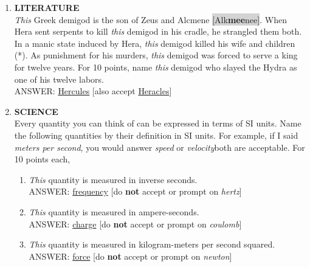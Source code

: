 \documentclass{report}
\newcommand*{\backtrack}{\setcounter{enumi}{\numexpr\theenumi-1\relax}}
\begin{document}
\begin{enumerate}
    \item \textbf{LITERATURE} \\ \textit{This} Greek demigod is the son of Zeus and Alcmene \colorbox{lightGray}{[Alk\textperiodcentered \textbf{mee}\textperiodcentered nee]}. When Hera sent serpents to kill \textit{this} demigod in his cradle, he strangled them both. In a manic state induced by Hera, \textit{this} demigod killed his wife and children (*). As punishment for his murders, \textit{this} demigod was forced to serve a king for twelve years. For 10 points, name \textit{this} demigod who slayed the Hydra as one of his twelve labors. \\ ANSWER: \underline{Hercules} [also accept \underline{Heracles}] \backtrack \newpage
    \item \textbf{SCIENCE} \\ Every quantity you can think of can be expressed in terms of SI units. Name the following quantities by their definition in SI units. For example, if I said \textit{meters per second}, you would answer \textit{speed} or \textit{velocity}\textemdash both are acceptable. For 10 points each,
    \begin{enumerate}[label=\Alph*]
        \item \textit{This} quantity is measured in inverse seconds. \\ ANSWER: \underline{frequency} [do \textbf{not} accept or prompt on \textit{hertz}]
        \item \textit{This} quantity is measured in ampere-seconds. \\ ANSWER: \underline{charge} [do \textbf{not} accept or prompt on \textit{coulomb}]
        \item \textit{This} quantity is measured in kilogram-meters per second squared. \\ ANSWER: \underline{force} [do \textbf{not} accept or prompt on \textit{newton}]
    \end{enumerate}


\end{enumerate}
\end{document}
